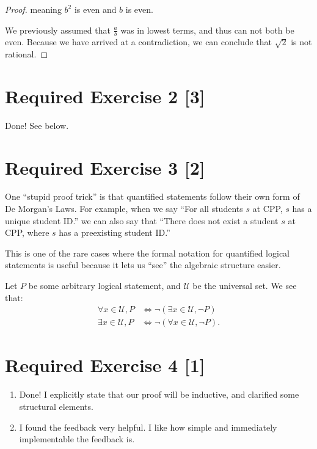 \documentclass{article}
\begin{document}
\begin{enumerate}
{\begin{proof}
            meaning \(b^2\) is even and \(b\) is even. 

            We previously assumed that \(\frac{a }{b}\) was in lowest terms, and 
            thus can not both be even. Because we have arrived at a contradiction, 
            we can conclude that \(\sqrt{2}\) is not rational. 
        \end{proof}
    }
\end{enumerate}

\section*{Required Exercise 2 [3]}
Done! See below. 

\section*{Required Exercise 3 [2]}

One ``stupid proof trick'' is that quantified statements follow their own form of 
De Morgan's Laws. For example, when we say ``For all students \(s\) at CPP, \(s\) 
has a unique student ID.'' we can also say that ``There does not exist a student \(s\)
at CPP, where \(s\) has a preexisting student ID.''

This is one of the rare cases where the formal notation for quantified logical 
statements is useful because it lets us ``see'' the algebraic structure easier. 

Let \(P\) be some arbitrary logical statement, and \(\mathcal{U}\) be the universal set.
We see that:
\begin{align*}
    \forall x \in \mathcal{U}, P &\Leftrightarrow \neg (\exists x \in \mathcal{U}, \neg P)\\
    \exists x \in \mathcal{U}, P &\Leftrightarrow \neg (\forall x \in \mathcal{U}, \neg P).
\end{align*}

\section*{Required Exercise 4 [1]}
\begin{enumerate}
    \item {
        Done! I explicitly state that our proof will be inductive, and clarified 
        some structural elements. 
    }
    \item {
        I found the feedback very helpful. I like how simple and immediately 
        implementable the feedback is. 
    }
\end{enumerate}
\end{document}

